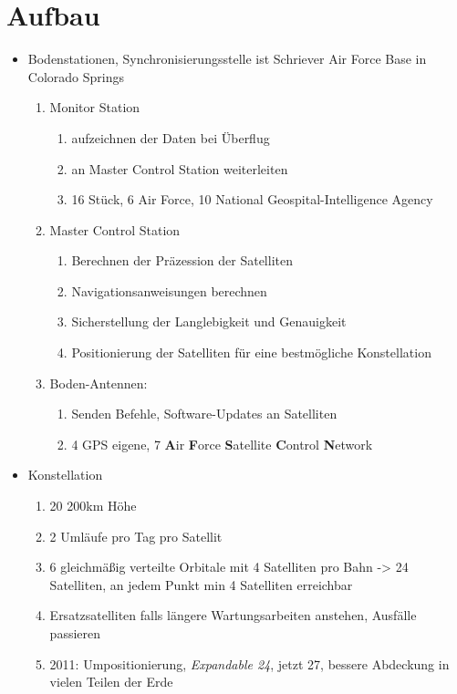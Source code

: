 \section{Aufbau}
\label{sec:aufbau}

\begin{itemize}
    \item Bodenstationen, Synchronisierungsstelle ist Schriever Air Force Base in Colorado Springs
    \begin{enumerate}
        \item Monitor Station
        \begin{enumerate}
            \item aufzeichnen der Daten bei Überflug
            \item an Master Control Station weiterleiten
            \item 16 Stück, 6 Air Force, 10 National Geospital-Intelligence Agency
        \end{enumerate}
        \item Master Control Station
        \begin{enumerate}
            \item Berechnen der Präzession der Satelliten
            \item Navigationsanweisungen berechnen
            \item Sicherstellung der Langlebigkeit und Genauigkeit
            \item Positionierung der Satelliten für eine bestmögliche Konstellation
        \end{enumerate}
        \item Boden-Antennen:
        \begin{enumerate}
            \item Senden Befehle, Software-Updates an Satelliten
            \item 4 GPS eigene, 7 \textbf{A}ir \textbf{F}orce \textbf{S}atellite \textbf{C}ontrol \textbf{N}etwork
        \end{enumerate}
    \end{enumerate}
    \item Konstellation
    \begin{enumerate}
        \item 20 200km Höhe
        \item 2 Umläufe pro Tag pro Satellit
        \item 6 gleichmäßig verteilte Orbitale mit 4 Satelliten pro Bahn -> 24 Satelliten, an jedem Punkt min 4 Satelliten erreichbar
        \item Ersatzsatelliten falls längere Wartungsarbeiten anstehen, Ausfälle passieren
        \item 2011: Umpositionierung, \textit{Expandable 24}, jetzt 27, bessere Abdeckung in vielen Teilen der Erde
    \end{enumerate}
\end{itemize}
